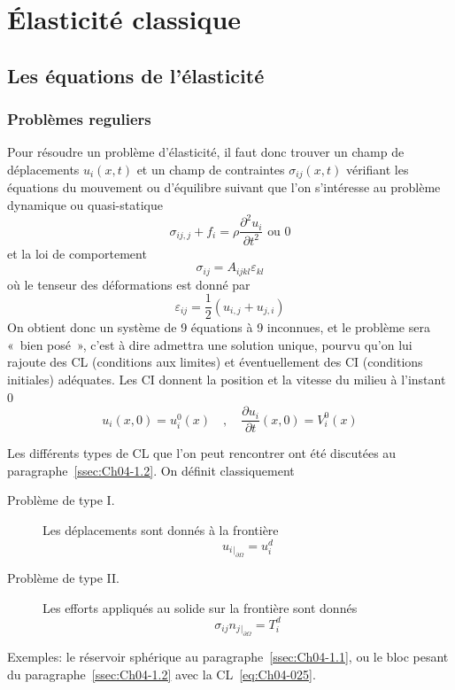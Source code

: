 \chapter{Élasticité classique} \label{chap:Ch06}
\section{Les équations de l'élasticité} \label{sec:Ch06-1}
\subsection{Problèmes reguliers} \label{ssec:Ch06-1.1}
Pour résoudre un problème d'élasticité, il faut donc trouver un champ de déplacements $u_i\left( x,t \right)$ et un champ de contraintes $\sigma_{ij}\left( x,t \right)$ vérifiant les équations du mouvement ou d'équilibre suivant que l'on s'intéresse au problème dynamique ou quasi-statique
\begin{equation}
    \sigma_{ij,j} + f_i = \rho \frac{\partial^2 u_i}{\partial t^2} \text{ ou } 0
    \label{eq:Ch06-001}
\end{equation}
et la loi de comportement
\begin{equation}
    \sigma_{ij} = A_{ijkl} \varepsilon_{kl}
    \label{eq:Ch06-002}
\end{equation}
où le tenseur des déformations est donné par
\begin{equation}
    \varepsilon_{ij} = \frac{1}{2} \left( u_{i,j} + u_{j,i} \right)
    \label{eq:Ch06-003}
\end{equation}
On obtient donc un système de 9 équations à 9 inconnues, et le problème sera «~bien posé~», c'est à dire admettra une solution unique, pourvu qu'on lui rajoute des CL (conditions aux limites) et éventuellement des CI (conditions initiales) adéquates.
Les CI donnent la position et la vitesse du milieu à l'instant 0
\begin{equation}
    u_i \left( x,0 \right) = u_{i}^0 (x) \quad, \quad \frac{\partial u_i}{\partial t} \left( x,0 \right) = V_i^0 \left( x \right)
    \label{eq:Ch06-004}
\end{equation}

Les différents types de CL que l'on peut rencontrer ont été discutées au paragraphe~\ref{ssec:Ch04-1.2}.
On définit classiquement
\begin{description}
    \item[Problème de type I.] Les déplacements sont donnés à la frontière
        \begin{equation}
            u_i{}_{|_{\partial \Omega}} = u_i^d
            \label{eq:Ch06-005}
        \end{equation}
    \item[Problème de type II.] Les efforts appliqués au solide sur la frontière sont donnés
        \begin{equation}
            \sigma_{ij} n_j{}_{|_{\partial \Omega}} = T_i^d
            \label{eq:Ch06-006}
        \end{equation}
\end{description}
Exemples: le réservoir sphérique au paragraphe~\ref{ssec:Ch04-1.1}, ou le bloc pesant du paragraphe~\ref{ssec:Ch04-1.2} avec la CL~\eqref{eq:Ch04-025}.

